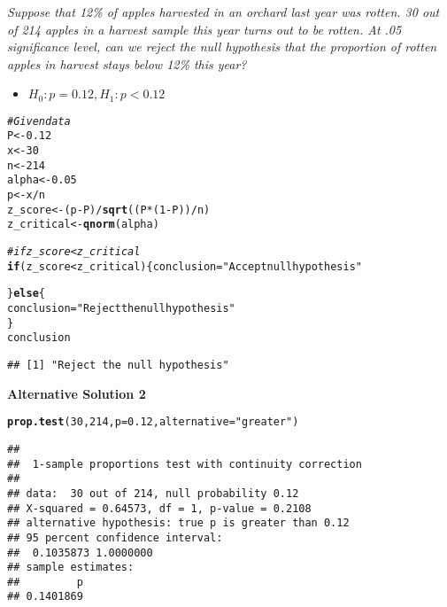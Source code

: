 \documentclass{article}\usepackage[]{graphicx}\usepackage[]{xcolor}
\makeatletter
\newcommand{\hlnum}[1]{\textcolor[rgb]{0.686,0.059,0.569}{#1}}%
\newcommand{\hlsng}[1]{\textcolor[rgb]{0.192,0.494,0.8}{#1}}%
\newcommand{\hlcom}[1]{\textcolor[rgb]{0.678,0.584,0.686}{\textit{#1}}}%
\newcommand{\hlopt}[1]{\textcolor[rgb]{0,0,0}{#1}}%
\newcommand{\hldef}[1]{\textcolor[rgb]{0.345,0.345,0.345}{#1}}%
\newcommand{\hlkwa}[1]{\textcolor[rgb]{0.161,0.373,0.58}{\textbf{#1}}}%
\newcommand{\hlkwb}[1]{\textcolor[rgb]{0.69,0.353,0.396}{#1}}%
\newcommand{\hlkwc}[1]{\textcolor[rgb]{0.333,0.667,0.333}{#1}}%
\newcommand{\hlkwd}[1]{\textcolor[rgb]{0.737,0.353,0.396}{\textbf{#1}}}%
\newenvironment{kframe}{%
 \def\at@end@of@kframe{}%
 \ifinner\ifhmode%
  \def\at@end@of@kframe{\end{minipage}}%
  \begin{minipage}{\columnwidth}%
 \fi\fi%
 \def\FrameCommand##1{\hskip\@totalleftmargin \hskip-\fboxsep
 \colorbox{shadecolor}{##1}\hskip-\fboxsep
     \hskip-\linewidth \hskip-\@totalleftmargin \hskip\columnwidth}%
 \MakeFramed {\advance\hsize-\width
   \@totalleftmargin\z@ \linewidth\hsize
   \@setminipage}}%
 {\par\unskip\endMakeFramed%
 \at@end@of@kframe}
\newenvironment{knitrout}{}{} %
\makeatother
\begin{document}
\emph{Suppose that 12\% of apples harvested in an orchard last year was rotten. 30 out of
214 apples in a harvest sample this year turns out to be rotten. At .05 significance
level, can we reject the null hypothesis that the proportion of rotten apples in
harvest stays below 12\% this year?}\\
\begin{itemize}
  \item $H_0:p=0.12, H_1: p<0.12$
\end{itemize}
\begin{knitrout}
\color{fgcolor}\begin{kframe}
\begin{alltt}
\hlcom{# Given data}
\hldef{P} \hlkwb{<-} \hlnum{0.12}
\hldef{x} \hlkwb{<-} \hlnum{30}
\hldef{n} \hlkwb{<-} \hlnum{214}
\hldef{alpha} \hlkwb{<-} \hlnum{0.05}
\hldef{p} \hlkwb{<-} \hldef{x} \hlopt{/} \hldef{n}
\hldef{z_score} \hlkwb{<-} \hldef{(p} \hlopt{-} \hldef{P)} \hlopt{/} \hlkwd{sqrt}\hldef{((P} \hlopt{*} \hldef{(}\hlnum{1} \hlopt{-} \hldef{P))} \hlopt{/} \hldef{n)}
\hldef{z_critical} \hlkwb{<-} \hlkwd{qnorm}\hldef{( alpha)}

\hlcom{# if z_score < z_critical}
\hlkwa{if} \hldef{(z_score} \hlopt{<} \hldef{z_critical) \{conclusion}\hlkwb{=}\hlsng{"Accept null hypothesis"}

\hldef{\}} \hlkwa{else} \hldef{\{}
  \hldef{conclusion} \hlkwb{=} \hlsng{"Reject the null hypothesis"}
\hldef{\}}
\hldef{conclusion}
\end{alltt}
\begin{verbatim}
## [1] "Reject the null hypothesis"
\end{verbatim}
\end{kframe}
\end{knitrout}
\textbf{Alternative Solution 2}\\
\begin{knitrout}
\color{fgcolor}\begin{kframe}
\begin{alltt}
\hlkwd{prop.test}\hldef{(}\hlnum{30}\hldef{,} \hlnum{214}\hldef{,} \hlkwc{p} \hldef{=} \hlnum{0.12}\hldef{,}\hlkwc{alternative} \hldef{=} \hlsng{"greater"} \hldef{)}
\end{alltt}
\begin{verbatim}
## 
## 	1-sample proportions test with continuity correction
## 
## data:  30 out of 214, null probability 0.12
## X-squared = 0.64573, df = 1, p-value = 0.2108
## alternative hypothesis: true p is greater than 0.12
## 95 percent confidence interval:
##  0.1035873 1.0000000
## sample estimates:
##         p 
## 0.1401869
\end{verbatim}
\end{kframe}
\end{knitrout}
\end{document}
